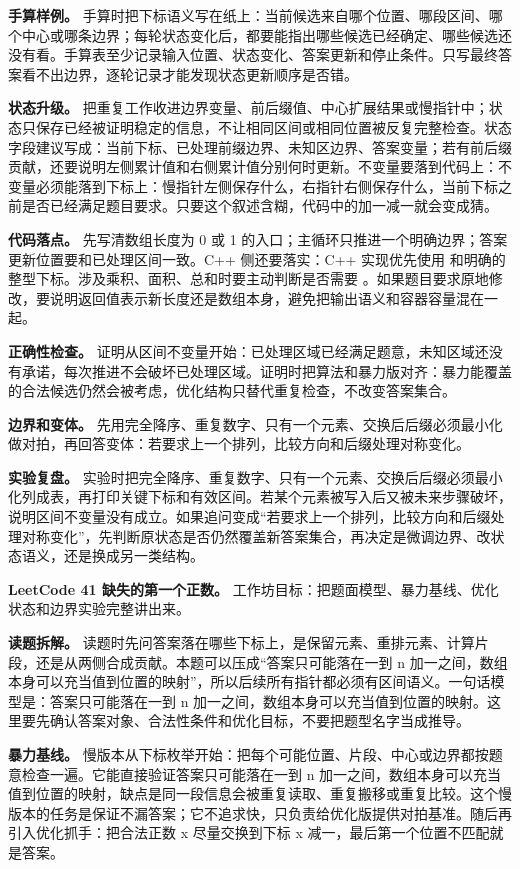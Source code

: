 \textbf{手算样例。} 手算时把下标语义写在纸上：当前候选来自哪个位置、哪段区间、哪个中心或哪条边界；每轮状态变化后，都要能指出哪些候选已经确定、哪些候选还没有看。手算表至少记录输入位置、状态变化、答案更新和停止条件。只写最终答案看不出边界，逐轮记录才能发现状态更新顺序是否错。

\textbf{状态升级。} 把重复工作收进边界变量、前后缀值、中心扩展结果或慢指针中；状态只保存已经被证明稳定的信息，不让相同区间或相同位置被反复完整检查。状态字段建议写成：当前下标、已处理前缀边界、未知区边界、答案变量；若有前后缀贡献，还要说明左侧累计值和右侧累计值分别何时更新。不变量要落到代码上：不变量必须能落到下标上：慢指针左侧保存什么，右指针右侧保存什么，当前下标之前是否已经满足题目要求。只要这个叙述含糊，代码中的加一减一就会变成猜。

\textbf{代码落点。} 先写清数组长度为 0 或 1 的入口；主循环只推进一个明确边界；答案更新位置要和已处理区间一致。C++ 侧还要落实：C++ 实现优先使用  和明确的整型下标。涉及乘积、面积、总和时要主动判断是否需要 。如果题目要求原地修改，要说明返回值表示新长度还是数组本身，避免把输出语义和容器容量混在一起。

\textbf{正确性检查。} 证明从区间不变量开始：已处理区域已经满足题意，未知区域还没有承诺，每次推进不会破坏已处理区域。证明时把算法和暴力版对齐：暴力能覆盖的合法候选仍然会被考虑，优化结构只替代重复检查，不改变答案集合。

\textbf{边界和变体。} 先用完全降序、重复数字、只有一个元素、交换后后缀必须最小化做对拍，再回答变体：若要求上一个排列，比较方向和后缀处理对称变化。

\textbf{实验复盘。} 实验时把完全降序、重复数字、只有一个元素、交换后后缀必须最小化列成表，再打印关键下标和有效区间。若某个元素被写入后又被未来步骤破坏，说明区间不变量没有成立。如果追问变成“若要求上一个排列，比较方向和后缀处理对称变化”，先判断原状态是否仍然覆盖新答案集合，再决定是微调边界、改状态语义，还是换成另一类结构。

\noindent\textbf{LeetCode 41 缺失的第一个正数。} 工作坊目标：把题面模型、暴力基线、优化状态和边界实验完整讲出来。

\textbf{读题拆解。} 读题时先问答案落在哪些下标上，是保留元素、重排元素、计算片段，还是从两侧合成贡献。本题可以压成“答案只可能落在一到 n 加一之间，数组本身可以充当值到位置的映射”，所以后续所有指针都必须有区间语义。一句话模型是：答案只可能落在一到 n 加一之间，数组本身可以充当值到位置的映射。这里要先确认答案对象、合法性条件和优化目标，不要把题型名字当成推导。

\textbf{暴力基线。} 慢版本从下标枚举开始：把每个可能位置、片段、中心或边界都按题意检查一遍。它能直接验证答案只可能落在一到 n 加一之间，数组本身可以充当值到位置的映射，缺点是同一段信息会被重复读取、重复搬移或重复比较。这个慢版本的任务是保证不漏答案；它不追求快，只负责给优化版提供对拍基准。随后再引入优化抓手：把合法正数 x 尽量交换到下标 x 减一，最后第一个位置不匹配就是答案。

